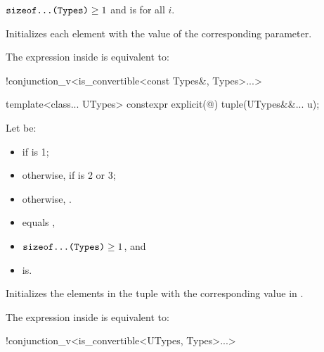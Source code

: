 \documentclass{wg21}
\begin{document}
\begin{itemdescr}
    \pnum
    \constraints
    $\texttt{sizeof...(Types)} \geq 1$ and
     is  for all $i$.
    
    \pnum
    \effects
    Initializes each element with the value of the
    corresponding parameter.
    
    \pnum
    \remarks
    The expression inside  is equivalent to:
    \begin{codeblock}
        !conjunction_v<is_convertible<const Types&, Types>...>
    \end{codeblock}
\end{itemdescr}

%
\begin{itemdecl}
    template<class... UTypes> constexpr explicit(@\seebelow@) tuple(UTypes&&... u);
\end{itemdecl}

\begin{itemdescr}
    \pnum
    Let  be:
    \begin{itemize}
        \item
        if  is 1;
        \item
        otherwise,
        if  is 2 or 3;
        \item
        otherwise, .
    \end{itemize}
    
    \pnum
    \constraints
    \begin{itemize}
        \item
         equals ,
        \item
        $\texttt{sizeof...(Types)} \geq 1$, and
        \item
         is\newline {}.
    \end{itemize}
    
    \pnum
    \effects
    Initializes the elements in the tuple with the
    corresponding value in .
    
    \pnum
    \remarks
    The expression inside  is equivalent to:
    \begin{codeblock}
        !conjunction_v<is_convertible<UTypes, Types>...>
    \end{codeblock}
\end{itemdescr}
\end{document}
